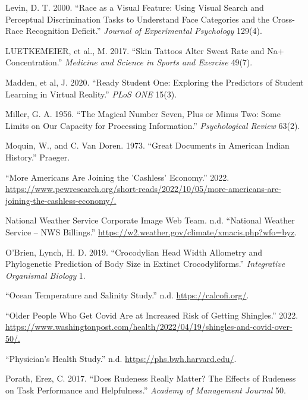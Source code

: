 \documentclass[
]{report}
\newlength{\cslhangindent}
\newenvironment{CSLReferences}[2] %
 {\begin{list}{}{%
  \setlength{\itemindent}{0pt}
  \setlength{\leftmargin}{0pt}
  \setlength{\parsep}{0pt}
  \ifodd #1
   \setlength{\leftmargin}{\cslhangindent}
   \setlength{\itemindent}{-1\cslhangindent}
  \fi
  \setlength{\itemsep}{#2\baselineskip}}}
 {\end{list}}
\begin{document}
\begin{CSLReferences}{1}{0}
Levin, D. T. 2000. {``Race as a Visual Feature: Using Visual Search and Perceptual Discrimination Tasks to Understand Face Categories and the Cross-Race Recognition Deficit.''} \emph{Journal of Experimental Psychology} 129(4).

LUETKEMEIER, et al., M. 2017. {``Skin Tattoos Alter Sweat Rate and Na+ Concentration.''} \emph{Medicine and Science in Sports and Exercise} 49(7).

Madden, et al, J. 2020. {``Ready Student One: Exploring the Predictors of Student Learning in Virtual Reality.''} \emph{PLoS ONE} 15(3).

Miller, G. A. 1956. {``The Magical Number Seven, Plus or Minus Two: Some Limits on Our Capacity for Processing Information.''} \emph{Psychological Review} 63(2).

Moquin, W., and C. Van Doren. 1973. {``Great Documents in American Indian History.''} Praeger.

{``More Americans Are Joining the 'Cashless' Economy.''} 2022. \url{https://www.pewresearch.org/short-reads/2022/10/05/more-americans-are-joining-the-cashless-economy/.}

National Weather Service Corporate Image Web Team. n.d. {``National Weather Service -- {NWS} Billings.''} \url{https://w2.weather.gov/climate/xmacis.php?wfo=byz}.

O'Brien, Lynch, H. D. 2019. {``Crocodylian Head Width Allometry and Phylogenetic Prediction of Body Size in Extinct Crocodyliforms.''} \emph{Integrative Organismal Biology} 1.

{``Ocean Temperature and Salinity Study.''} n.d. \url{https://calcofi.org/}.

{``Older People Who Get Covid Are at Increased Risk of Getting Shingles.''} 2022. \url{https://www.washingtonpost.com/health/2022/04/19/shingles-and-covid-over-50/.}

{``Physician's Health Study.''} n.d. \url{https://phs.bwh.harvard.edu/}.

Porath, Erez, C. 2017. {``Does Rudeness Really Matter? The Effects of Rudeness on Task Performance and Helpfulness.''} \emph{Academy of Management Journal} 50.


\end{CSLReferences}
\end{document}
